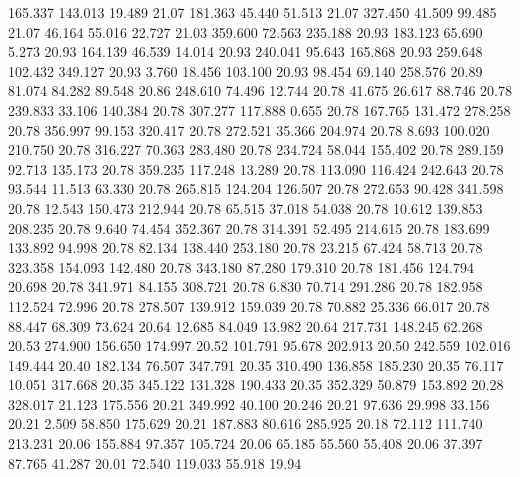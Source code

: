  165.337  143.013   19.489        21.07
 181.363   45.440   51.513        21.07
 327.450   41.509   99.485        21.07
  46.164   55.016   22.727        21.03
 359.600   72.563  235.188        20.93
 183.123   65.690    5.273        20.93
 164.139   46.539   14.014        20.93
 240.041   95.643  165.868        20.93
 259.648  102.432  349.127        20.93
   3.760   18.456  103.100        20.93
  98.454   69.140  258.576        20.89
  81.074   84.282   89.548        20.86
 248.610   74.496   12.744        20.78
  41.675   26.617   88.746        20.78
 239.833   33.106  140.384        20.78
 307.277  117.888    0.655        20.78
 167.765  131.472  278.258        20.78
 356.997   99.153  320.417        20.78
 272.521   35.366  204.974        20.78
   8.693  100.020  210.750        20.78
 316.227   70.363  283.480        20.78
 234.724   58.044  155.402        20.78
 289.159   92.713  135.173        20.78
 359.235  117.248   13.289        20.78
 113.090  116.424  242.643        20.78
  93.544   11.513   63.330        20.78
 265.815  124.204  126.507        20.78
 272.653   90.428  341.598        20.78
  12.543  150.473  212.944        20.78
  65.515   37.018   54.038        20.78
  10.612  139.853  208.235        20.78
   9.640   74.454  352.367        20.78
 314.391   52.495  214.615        20.78
 183.699  133.892   94.998        20.78
  82.134  138.440  253.180        20.78
  23.215   67.424   58.713        20.78
 323.358  154.093  142.480        20.78
 343.180   87.280  179.310        20.78
 181.456  124.794   20.698        20.78
 341.971   84.155  308.721        20.78
   6.830   70.714  291.286        20.78
 182.958  112.524   72.996        20.78
 278.507  139.912  159.039        20.78
  70.882   25.336   66.017        20.78
  88.447   68.309   73.624        20.64
  12.685   84.049   13.982        20.64
 217.731  148.245   62.268        20.53
 274.900  156.650  174.997        20.52
 101.791   95.678  202.913        20.50
 242.559  102.016  149.444        20.40
 182.134   76.507  347.791        20.35
 310.490  136.858  185.230        20.35
  76.117   10.051  317.668        20.35
 345.122  131.328  190.433        20.35
 352.329   50.879  153.892        20.28
 328.017   21.123  175.556        20.21
 349.992   40.100   20.246        20.21
  97.636   29.998   33.156        20.21
   2.509   58.850  175.629        20.21
 187.883   80.616  285.925        20.18
  72.112  111.740  213.231        20.06
 155.884   97.357  105.724        20.06
  65.185   55.560   55.408        20.06
  37.397   87.765   41.287        20.01
  72.540  119.033   55.918        19.94
